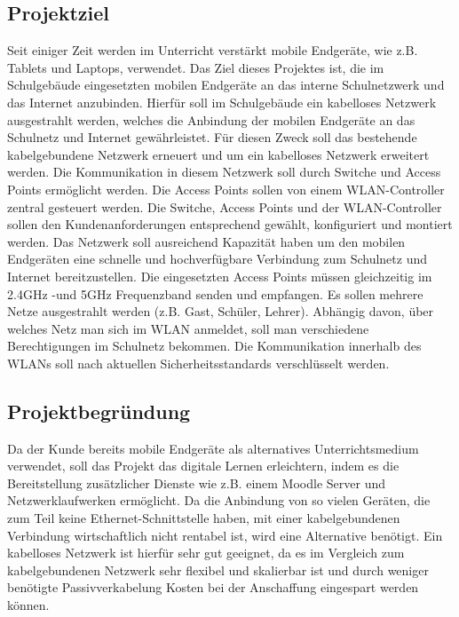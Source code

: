 \subsection{Projektziel} 
\label{sec:Projektziel}
Seit einiger Zeit werden im Unterricht verstärkt mobile Endgeräte, wie z.B. Tablets und Laptops, verwendet. Das Ziel dieses Projektes ist, die im Schulgebäude eingesetzten mobilen Endgeräte an das interne Schulnetzwerk und das Internet anzubinden. Hierfür soll im Schulgebäude ein kabelloses Netzwerk ausgestrahlt werden, welches die Anbindung der mobilen Endgeräte an das Schulnetz und Internet gewährleistet. Für diesen Zweck soll das bestehende kabelgebundene Netzwerk erneuert und um ein kabelloses Netzwerk erweitert werden. Die Kommunikation in diesem Netzwerk soll durch Switche und Access Points ermöglicht werden. Die Access Points sollen von einem WLAN-Controller zentral gesteuert werden. Die Switche, Access Points und der WLAN-Controller sollen den Kundenanforderungen entsprechend gewählt, konfiguriert und montiert werden. Das Netzwerk soll ausreichend Kapazität haben um den mobilen Endgeräten eine schnelle und hochverfügbare Verbindung zum Schulnetz und Internet bereitzustellen. Die eingesetzten Access Points müssen gleichzeitig im 2.4GHz -und 5GHz Frequenzband senden und empfangen. Es sollen mehrere Netze ausgestrahlt werden (z.B. Gast, Schüler, Lehrer). Abhängig davon, über welches Netz man sich im WLAN anmeldet, soll man verschiedene Berechtigungen im Schulnetz bekommen. Die Kommunikation innerhalb des WLANs soll nach aktuellen Sicherheitsstandards verschlüsselt werden.


\subsection{Projektbegründung} 
\label{sec:Projektbegruendung}
Da der Kunde bereits mobile Endgeräte als alternatives Unterrichtsmedium verwendet, soll das Projekt das digitale Lernen erleichtern, indem es die Bereitstellung zusätzlicher Dienste wie z.B. einem Moodle Server und Netzwerklaufwerken ermöglicht. Da die Anbindung von so vielen Geräten, die zum Teil keine Ethernet-Schnittstelle haben, mit einer kabelgebundenen Verbindung wirtschaftlich nicht rentabel ist, wird eine Alternative benötigt. Ein kabelloses Netzwerk ist hierfür sehr gut geeignet, da es im Vergleich zum kabelgebundenen Netzwerk sehr flexibel und skalierbar ist und durch weniger benötigte Passivverkabelung Kosten bei der Anschaffung eingespart werden können. 


